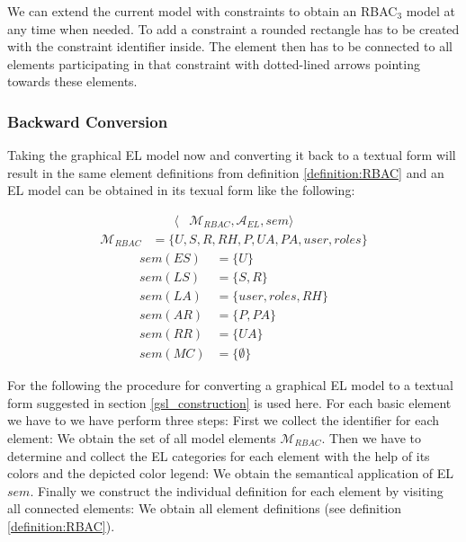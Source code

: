 \documentclass[twoside, openright, 12pt]{book}
\begin{document}
\noindent
We can extend the current model with constraints to obtain an RBAC$_3$ model at any time when needed.
To add a constraint a rounded rectangle has to be created with the constraint identifier inside.
The element then has to be connected to all elements participating in that constraint with dotted-lined arrows pointing towards these elements.



\subsubsection{Backward Conversion}
Taking the graphical EL model now and converting it back to a textual form will result in the same element definitions from definition \ref{definition:RBAC} and an EL model can be obtained in its texual form like the following:

\begin{align*}
\langle &\mathcal{M}_{\mathit{RBAC}}, \mathcal{A}_{\mathit{EL}}, sem \rangle
\end{align*}
\begin{align*}
\mathcal{M}_{\mathit{RBAC}} &= \lbrace U, S, R, \mathit{RH}, P, \mathit{UA}, \mathit{PA}, \mathit{user}, \mathit{roles} \rbrace
\end{align*}
\begin{align*}
\mathit{sem}(\mathit{ES}) &= \lbrace U \rbrace\\
\mathit{sem}(\mathit{LS}) &= \lbrace S, R \rbrace\\
\mathit{sem}(\mathit{LA}) &= \lbrace user, roles, \mathit{RH} \rbrace\\
\mathit{sem}(\mathit{AR}) &= \lbrace P, \mathit{PA} \rbrace\\
\mathit{sem}(\mathit{RR}) &= \lbrace \mathit{UA} \rbrace\\
\mathit{sem}(\mathit{MC}) &= \lbrace \emptyset \rbrace
\end{align*}

\noindent
For the following the procedure for converting a graphical EL model to a textual form suggested in section \ref{gsl_construction} is used here.
For each basic element we have to we have perform three steps:
First we collect the identifier for each element: We obtain the set of all model elements $\mathcal{M}_{\mathit{RBAC}}$.
Then we have to determine and collect the EL categories for each element with the help of its colors and the depicted color legend: We obtain the semantical application of EL $\mathit{sem}$.
Finally we construct the individual definition for each element by visiting all connected elements: We obtain all element definitions (see definition \ref{definition:RBAC}).
\end{document}
